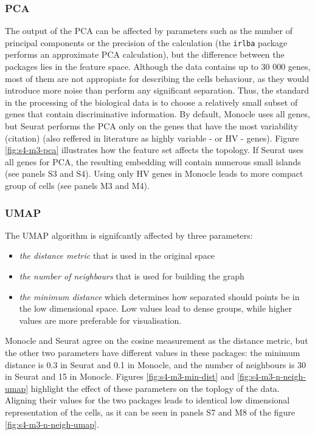 \subsubsection{PCA}
The output of the PCA can be affected by parameters such as the number of principal components or the precision of the calculation (the \verb|irlba| package performs an approximate PCA calculation), but the difference between the packages lies in the feature space. Although the data contains up to 30 000 genes, most of them are not appropiate for describing the cells behaviour, as they would introduce more noise than perform any significant separation. Thus, the standard in the processing of the biological data is to choose a relatively small subset of genes that contain discriminative information. By default, Monocle uses all genes, but Seurat performs the PCA only on the genes that have the most variability (citation) (also reffered in literature as highly variable - or HV - genes). Figure \ref{fig:s4-m3-pca} illustrates how the feature set affects the topology. If Seurat uses all genes for PCA, the resulting embedding will contain numerous small islands (see panels S3 and S4). Using only HV genes in Monocle leads to more compact group of cells (see panels M3 and M4).

\subsubsection{UMAP}
The UMAP algorithm is signifcantly affected by three parameters:
\begin{itemize}
    \item \textit{the distance metric} that is used in the original space
    \item \textit{the number of neighbours} that is used for building the graph
    \item \textit{the minimum distance} which determines how separated should points be in the low dimensional space. Low values lead to dense groups, while higher values are more preferable for visualisation.
\end{itemize}

Monocle and Seurat agree on the cosine measurement as the distance metric, but the other two parameters have different values in these packages: the minimum distance is 0.3 in Seurat and 0.1 in Monocle, and the number of neighbours is 30 in Seurat and 15 in Monocle. Figures \ref{fig:s4-m3-min-dist} and \ref{fig:s4-m3-n-neigh-umap} highlight the effect of these parameters on the toplogy of the data. Aligning their values for the two packages leads to identical low dimensional representation of the cells, as it can be seen in panels S7 and M8 of the figure \ref{fig:s4-m3-n-neigh-umap}.

